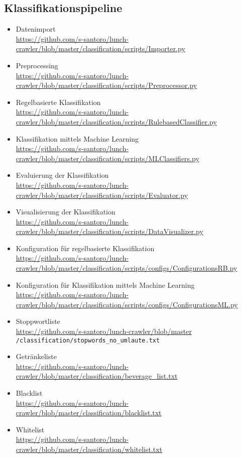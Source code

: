 \subsection{Klassifikationspipeline}
\label{app:classification}
\begin{itemize}
	\item Datenimport\\ 
	\url{https://github.com/s-santoro/lunch-crawler/blob/master/classification/scripts/Importer.py}
	\item Preprocessing\\ 
	\url{https://github.com/s-santoro/lunch-crawler/blob/master/classification/scripts/Preprocessor.py}
	\item Regelbasierte Klassifikation\\ 
	\url{https://github.com/s-santoro/lunch-crawler/blob/master/classification/scripts/RulebasedClassifier.py}
	\item Klassifikation mittels Machine Learning\\ 
	\url{https://github.com/s-santoro/lunch-crawler/blob/master/classification/scripts/MLClassifiers.py}
	\item Evaluierung der Klassifikation\\ 
	\url{https://github.com/s-santoro/lunch-crawler/blob/master/classification/scripts/Evaluator.py}
	\item Visualisierung der Klassifikation\\ 
	\url{https://github.com/s-santoro/lunch-crawler/blob/master/classification/scripts/DataVisualizer.py}
	\item Konfiguration für regelbasierte Klassifikation\\ 
	\url{https://github.com/s-santoro/lunch-crawler/blob/master/classification/scripts/configs/ConfigurationsRB.py}
	\item Konfiguration für Klassifikation mittels Machine Learning\\ 
	\url{https://github.com/s-santoro/lunch-crawler/blob/master/classification/scripts/configs/ConfigurationsML.py}
	\item Stoppwortliste\\ 
	\url{https://github.com/s-santoro/lunch-crawler/blob/master}
	{\nolinkurl{/classification/stopwords_no_umlaute.txt}}
	\item Getränkeliste\\ 
	\url{https://github.com/s-santoro/lunch-crawler/blob/master/classification/beverage_list.txt}
	\item Blacklist\\ 
	\url{https://github.com/s-santoro/lunch-crawler/blob/master/classification/blacklist.txt}
	\item Whitelist\\ 
	\url{https://github.com/s-santoro/lunch-crawler/blob/master/classification/whitelist.txt}
\end{itemize} 
